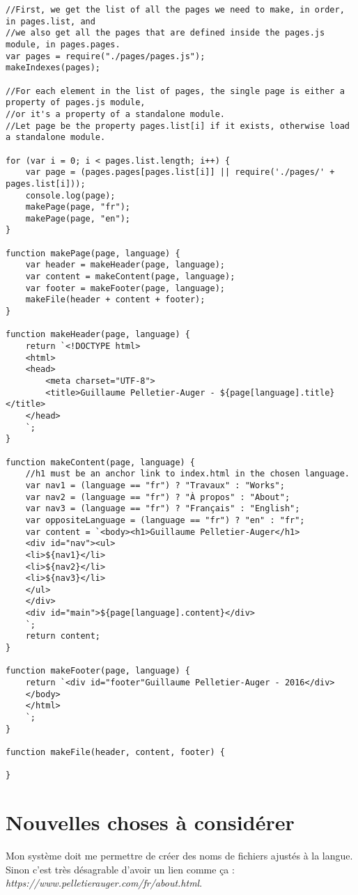 \begin{lstlisting}
//First, we get the list of all the pages we need to make, in order, in pages.list, and
//we also get all the pages that are defined inside the pages.js module, in pages.pages.
var pages = require("./pages/pages.js");
makeIndexes(pages);

//For each element in the list of pages, the single page is either a property of pages.js module,
//or it's a property of a standalone module.
//Let page be the property pages.list[i] if it exists, otherwise load a standalone module.

for (var i = 0; i < pages.list.length; i++) {
    var page = (pages.pages[pages.list[i]] || require('./pages/' + pages.list[i]));
    console.log(page);
    makePage(page, "fr");
    makePage(page, "en");
}

function makePage(page, language) {
    var header = makeHeader(page, language);
    var content = makeContent(page, language);
    var footer = makeFooter(page, language);
    makeFile(header + content + footer);
}

function makeHeader(page, language) {
    return `<!DOCTYPE html>
    <html>
    <head>
        <meta charset="UTF-8">
        <title>Guillaume Pelletier-Auger - ${page[language].title}</title>
    </head>
    `;
}

function makeContent(page, language) {
    //h1 must be an anchor link to index.html in the chosen language.
    var nav1 = (language == "fr") ? "Travaux" : "Works";
    var nav2 = (language == "fr") ? "À propos" : "About";
    var nav3 = (language == "fr") ? "Français" : "English";
    var oppositeLanguage = (language == "fr") ? "en" : "fr";
    var content = `<body><h1>Guillaume Pelletier-Auger</h1>
    <div id="nav"><ul>
    <li>${nav1}</li>
    <li>${nav2}</li>
    <li>${nav3}</li>
    </ul>
    </div>
    <div id="main">${page[language].content}</div>
    `;
    return content;
}

function makeFooter(page, language) {
    return `<div id="footer"Guillaume Pelletier-Auger - 2016</div>
    </body>
    </html>
    `;
}

function makeFile(header, content, footer) {

}

\end{lstlisting}

\section{Nouvelles choses à considérer}
Mon système doit me permettre de créer des noms de fichiers ajustés à la langue. Sinon c'est très désagrable d'avoir un lien comme ça : \textit{https://www.pelletierauger.com/fr/about.html}.

